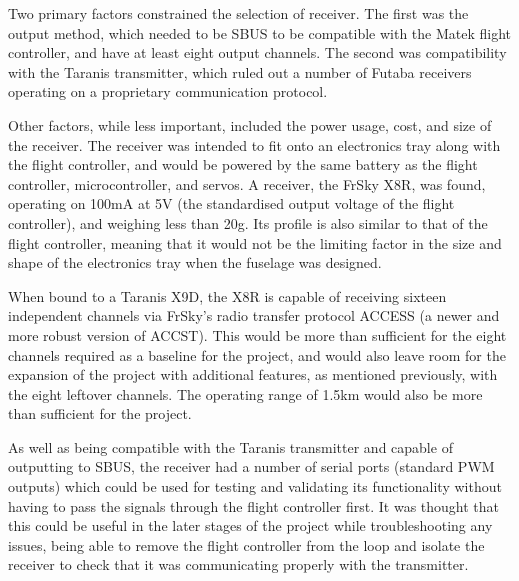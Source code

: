 \documentclass[../../main.tex]{subfiles}
\begin{document}
Two primary factors constrained the selection of receiver.
The first was the output method, which needed to be SBUS to be compatible with the Matek flight controller, and have at least eight output channels.
The second was compatibility with the Taranis transmitter, which ruled out a number of Futaba receivers operating on a proprietary communication protocol. 

Other factors, while less important, included the power usage, cost, and size of the receiver.
The receiver was intended to fit onto an electronics tray along with the flight controller, and would be powered by the same battery as the flight controller, microcontroller, and servos.
A receiver, the FrSky X8R, was found, operating on 100mA at 5V (the standardised output voltage of the flight controller), and weighing less than 20g.
Its profile is also similar to that of the flight controller, meaning that it would not be the limiting factor in the size and shape of the electronics tray when the fuselage was designed. 

When bound to a Taranis X9D, the X8R is capable of receiving sixteen independent channels via FrSky’s radio transfer protocol ACCESS (a newer and more robust version of ACCST).
This would be more than sufficient for the eight channels required as a baseline for the project, and would also leave room for the expansion of the project with additional features, as mentioned previously, with the eight leftover channels.
The operating range of 1.5km would also be more than sufficient for the project. 

As well as being compatible with the Taranis transmitter and capable of outputting to SBUS, the receiver had a number of serial ports (standard PWM outputs) which could be used for testing and validating its functionality without having to pass the signals through the flight controller first.
It was thought that this could be useful in the later stages of the project while troubleshooting any issues, being able to remove the flight controller from the loop and isolate the receiver to check that it was communicating properly with the transmitter. 
\end{document}
